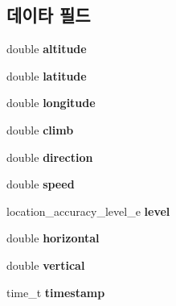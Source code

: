\subsection*{데이타 필드}
\begin{DoxyCompactItemize}
\item 
\hypertarget{struct__location_a2b13d276aee0d9fd646c8fa3647e869b}{double {\bfseries altitude}}\label{struct__location_a2b13d276aee0d9fd646c8fa3647e869b}

\item 
\hypertarget{struct__location_a76714bdbc5c536fa77dfb14533ff82a9}{double {\bfseries latitude}}\label{struct__location_a76714bdbc5c536fa77dfb14533ff82a9}

\item 
\hypertarget{struct__location_ac155e35fdeebafc89723a51520fb9fe6}{double {\bfseries longitude}}\label{struct__location_ac155e35fdeebafc89723a51520fb9fe6}

\item 
\hypertarget{struct__location_a72cbc74638e72ebd02fc3b0bd2cb80af}{double {\bfseries climb}}\label{struct__location_a72cbc74638e72ebd02fc3b0bd2cb80af}

\item 
\hypertarget{struct__location_a8da9718bd3d0396135453cbb12751a5b}{double {\bfseries direction}}\label{struct__location_a8da9718bd3d0396135453cbb12751a5b}

\item 
\hypertarget{struct__location_a6dc6e6f3c75c509ce943163afb5dade7}{double {\bfseries speed}}\label{struct__location_a6dc6e6f3c75c509ce943163afb5dade7}

\item 
\hypertarget{struct__location_ab42edaa8e596f16b6ff545b9256a4508}{location\-\_\-accuracy\-\_\-level\-\_\-e {\bfseries level}}\label{struct__location_ab42edaa8e596f16b6ff545b9256a4508}

\item 
\hypertarget{struct__location_aababb3cab13d0b7706c591b114d9ef9a}{double {\bfseries horizontal}}\label{struct__location_aababb3cab13d0b7706c591b114d9ef9a}

\item 
\hypertarget{struct__location_af585cb3fb143047cf641307ab9f5a2f0}{double {\bfseries vertical}}\label{struct__location_af585cb3fb143047cf641307ab9f5a2f0}

\item 
\hypertarget{struct__location_a2f48d949c7a1e7bf2ce81c70caa7c3ec}{time\-\_\-t {\bfseries timestamp}}\label{struct__location_a2f48d949c7a1e7bf2ce81c70caa7c3ec}

\end{DoxyCompactItemize}


